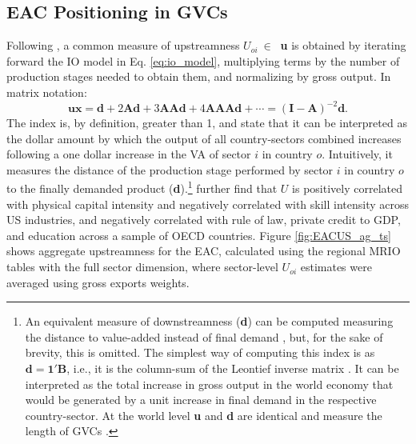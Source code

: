 \documentclass[a4paper]{article}
\begin{document}
\subsection{EAC Positioning in GVCs}

Following \citet{antras2012measuring, antras2022global}, a common measure of upstreamness $U_{oi} \ \in \ $ \textbf{u} is obtained by iterating forward the IO model in Eq. \ref{eq:io_model}, multiplying terms by the number of production stages needed to obtain them, and normalizing by gross output. In matrix notation: 
\begin{equation} \label{eq:upstreamness}
\textbf{u}\textbf{x} = \textbf{d} + 2\textbf{Ad} + 3\textbf{AAd} + 4\textbf{AAAd} + \cdots = (\textbf{I}-\textbf{A})^{-2}\textbf{d}.
\end{equation}
The index is, by definition, greater than 1, and \citet{antras2012measuring} state that it can be interpreted as the dollar amount by which the output of all country-sectors combined increases following a one dollar increase in the VA of sector $i$ in country $o$. Intuitively, it measures the distance of the production stage performed by sector $i$ in country $o$ to the finally demanded product (\textbf{d}).\footnote{An equivalent measure of downstreamness (\textbf{d}) can be computed measuring the distance to value-added instead of final demand \citep{antras2022global, miller2017output, mancini2023positioning}, but, for the sake of brevity, this is omitted. The simplest way of computing this index is as $\textbf{d}=\textbf{1}'\textbf{B}$, i.e., it is the column-sum of the Leontief inverse matrix \citep{miller2017output, antras2022global}. It can be interpreted as the total increase in gross output in the world economy that would be generated by a unit increase in final demand in the respective country-sector. At the world level \textbf{u} and \textbf{d} are identical and measure the length of GVCs \citep{mancini2023positioning}.} \citet{antras2012measuring} further find that $U$ is positively correlated with physical capital intensity and negatively correlated with skill intensity across US industries, and negatively correlated with rule of law, private credit to GDP, and education across a sample of OECD countries. Figure \ref{fig:EACUS_ag_ts} shows aggregate upstreamness for the EAC, calculated using the  regional MRIO tables with the full sector dimension, where sector-level $U_{oi}$ estimates were averaged using gross exports weights. \newline
\end{document}
